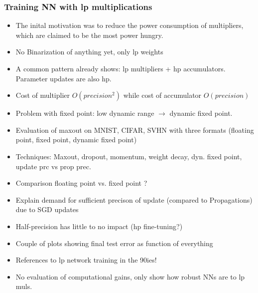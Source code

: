 \documentclass{article}
\begin{document}
\subsubsection*{Training NN with lp multiplications}
    \begin{itemize}
    \item The inital motivation was to reduce the power consumption of multipliers,
    which are claimed to be the most power hungry.
    \item No Binarization of anything yet, only lp weights
    \item A common pattern already shows: lp multipliers + hp accumulators.
    Parameter updates are also hp.
    \item Cost of multiplier $O(precision^2)$ while cost of accumulator $O(precision)$
    \item Problem with fixed point: low dynamic range $\rightarrow$ dynamic fixed point.
    \item Evaluation of maxout on MNIST, CIFAR, SVHN with three formats (floating
    point, fixed point, dynamic fixed point)
    \item Techniques: Maxout, dropout, momentum, weight decay, dyn. fixed point,
    update prc vs prop prec.
    \item Comparison floating point vs. fixed point ?
    \item Explain demand for sufficient precison of update (compared to Propagations)
    due to SGD updates
    \item Half-precision has little to no impact (hp fine-tuning?)
    \item Couple of plots showing final test error as function of everything
    \item References to lp network training in the 90ies!
    \item No evaluation of computational gains, only show how robust NNs are to lp muls.
    \end{itemize}
\end{document}
